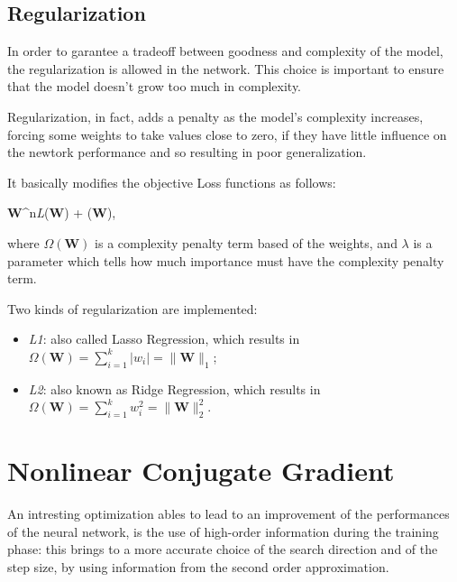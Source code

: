 		\subsection{Regularization}
		\label{sec:regularization}

			In order to garantee a tradeoff between goodness and complexity of the model, the regularization is allowed in the network. This choice is important to ensure that the model doesn't grow too much in complexity.

			Regularization, in fact, adds a penalty as the model's complexity increases, forcing some weights to take values close to zero,  if they have little influence on the newtork performance and so resulting in poor generalization.

			It basically modifies the objective Loss functions as follows:

			\begin{mini}
			  {\textbf{W}\in {}^n}{\textit{L}(\textbf{W}) + \lambda\Omega(\textbf{W}),}{}{}
			\end{mini}

			where $\Omega(\textbf{W})$ is a complexity penalty term based of the weights, and $\lambda$ is a parameter which tells how much importance must have the complexity penalty term.

			Two kinds of regularization are implemented:

			\begin{itemize}
				\item \textit{L1}: also called Lasso Regression, which results in $\Omega(\textbf{W}) = \sum_{i=1}^{k} |w_i| = \|\textbf{W}\|_1$;
				\item \textit{L2}: also known as Ridge Regression, which results in $\Omega(\textbf{W}) = \sum_{i=1}^{k}w_i^2 = \|\textbf{W}\|_2^2$.
			\end{itemize}




	\section{Nonlinear Conjugate Gradient}
	\label{sec:nonlinear_conjugate_gradient}

		An intresting optimization ables to lead to an improvement of the performances of the neural network, is the use of high-order information during the training phase: this brings to a more accurate choice of the search direction and of the step size, by using information from the second order approximation.

